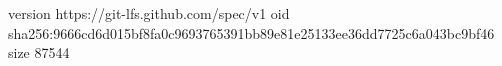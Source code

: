 version https://git-lfs.github.com/spec/v1
oid sha256:9666cd6d015bf8fa0c9693765391bb89e81e25133ee36dd7725c6a043bc9bf46
size 87544
